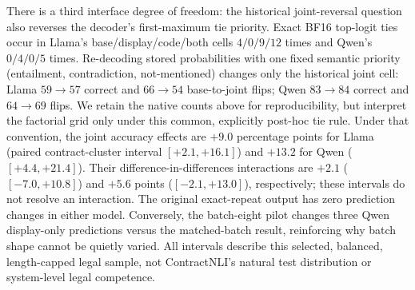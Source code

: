 There is a third interface degree of freedom: the historical joint-reversal
question also reverses the decoder's first-maximum tie priority. Exact BF16
top-logit ties occur in Llama's base/display/code/both cells $4/0/9/12$
times and Qwen's $0/4/0/5$ times. Re-decoding stored probabilities with
one fixed semantic priority (entailment, contradiction, not-mentioned)
changes only the historical joint cell: Llama $59\to57$ correct and
$66\to54$ base-to-joint flips; Qwen $83\to84$ correct and $64\to69$ flips.
We retain the native counts above for reproducibility, but interpret the
factorial grid only under this common, explicitly post-hoc tie rule.
Under that convention, the joint accuracy effects are $+9.0$ percentage
points for Llama (paired contract-cluster interval $[+2.1,+16.1]$) and
$+13.2$ for Qwen ($[+4.4,+21.4]$). Their difference-in-differences
interactions are $+2.1$ ($[-7.0,+10.8]$) and $+5.6$ points
($[-2.1,+13.0]$), respectively; these intervals do not resolve an
interaction. The original exact-repeat output has zero prediction changes
in either model. Conversely, the batch-eight pilot changes three Qwen
display-only predictions versus the matched-batch result, reinforcing why
batch shape cannot be quietly varied. All intervals describe this selected,
balanced, length-capped legal sample, not ContractNLI's natural test
distribution or system-level legal competence.
\FloatBarrier
